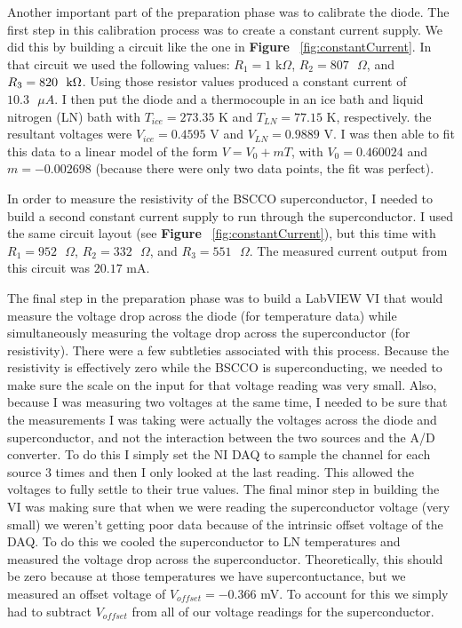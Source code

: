 \documentclass[paper=a4, fontsize=11pt]{scrartcl}
\numberwithin{equation}{section}
\numberwithin{figure}{section}
\numberwithin{table}{section}
\begin{document}
            Another important part of the preparation phase was to calibrate the diode. The first step in this calibration process was to create a constant current supply. We did this by building a circuit like the one in \textbf{Figure} ~\ref{fig:constantCurrent}. In that circuit we used the following values: $R_1 = 1 \text{ k} \Omega$, $R_2 = 807 \text{ }\Omega$, and $R_3 = 820 \text{ \text{ k}} \Omega$. Using those resistor values produced a constant current of $10.3 \text{ }\mu A$. I then put the diode and a thermocouple in an ice bath and liquid nitrogen (LN) bath with $T_{ice} = 273.35$ K and $T_{LN} = 77.15$ K, respectively. the resultant voltages were $V_{ice} = 0.4595$ V and $V_{LN} = 0.9889$ V. I was then able to fit this data to a linear model of the form $V = V_0 + m T$, with $V_0 = 0.460024$ and $m = -0.002698$ (because there were only two data points, the fit was perfect).

             In order to measure the resistivity of the BSCCO superconductor, I needed to build a second constant current supply to run through the superconductor. I used the same circuit layout (see \textbf{Figure} ~\ref{fig:constantCurrent}), but this time with $R_1 = 952 \text{ }\Omega$, $R_2 = 332 \text{ } \Omega$, and $R_3 = 551 \text{ } \Omega$. The measured current output from this circuit was $20.17$ mA.

             The final step in the preparation phase was to build a LabVIEW VI that would measure the voltage drop across the diode (for temperature data) while simultaneously measuring the voltage drop across the superconductor (for resistivity). There were a few subtleties associated with this process. Because the resistivity is effectively zero while the BSCCO is superconducting, we needed to make sure the scale on the input for that voltage reading was very small. Also, because I was measuring two voltages at the same time, I needed to be sure that the measurements I was taking were actually the voltages across the diode and superconductor, and not the interaction between the two sources and the A/D converter. To do this I simply set the NI DAQ to sample the channel for each source 3 times and then I only looked at the last reading. This allowed the voltages to fully settle to their true values. The final minor step in building the VI was making sure that when we were reading the superconductor voltage (very small) we weren't getting poor data because of the intrinsic offset voltage of the DAQ. To do this we cooled the superconductor to LN temperatures and measured the voltage drop across the superconductor. Theoretically, this should be zero because at those temperatures we have supercontuctance, but we measured an offset voltage of $V_{offset} = -0.366 $ mV. To account for this we simply had to subtract $V_{offset}$ from all of our voltage readings for the superconductor.
\end{document}
